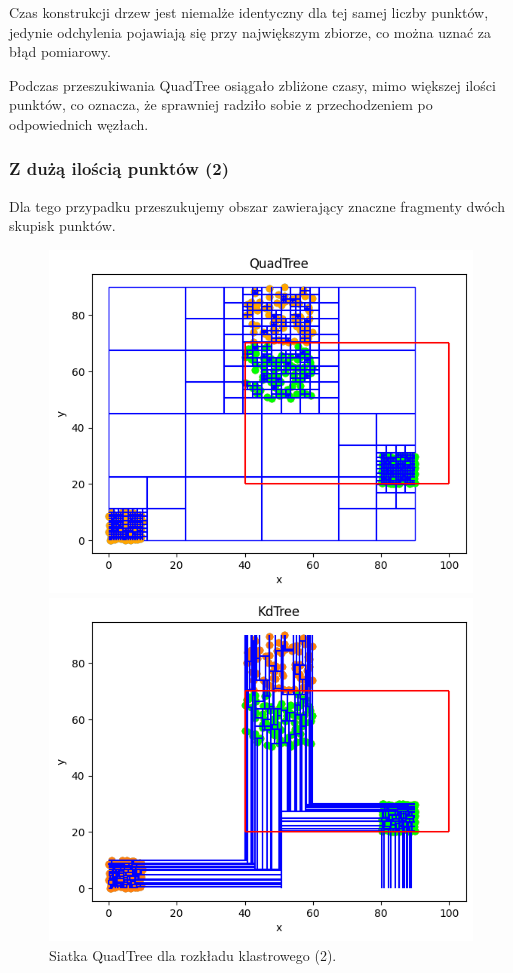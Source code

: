 \documentclass{lab}
\begin{document}
Czas konstrukcji drzew jest niemalże identyczny dla tej samej liczby punktów, jedynie odchylenia pojawiają się przy największym zbiorze, co można uznać za błąd pomiarowy.

Podczas przeszukiwania QuadTree osiągało zbliżone czasy, mimo większej ilości punktów, co oznacza, że sprawniej radziło sobie z przechodzeniem po odpowiednich węzłach.

\newpage
\subsubsection{Z dużą ilością punktów (2)}
Dla tego przypadku przeszukujemy obszar zawierający znaczne fragmenty dwóch skupisk punktów.

\begin{figure}[H]
  \centering
  \begin{minipage}{0.495\textwidth}
      \centering
      \includegraphics[width=1\textwidth]{resources/cluster_QuadTree_2.png}
      \caption{Siatka QuadTree dla rozkładu klastrowego (2).}
      \label{fig:cluster_QuadTree_2}
  \end{minipage}
  \begin{minipage}{0.495\textwidth}
      \centering
      \includegraphics[width=1\textwidth]{resources/cluster_KdTree_2.png}

\end{minipage}
\end{figure}
\end{document}
